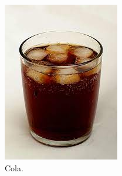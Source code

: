 \documentclass{article}
\begin{document}
	\begin{figure}[h!]
		\centering
		\begin{subfigure}[b]{0.2\linewidth}
		
		\includegraphics[width=\linewidth]{drink.jpg}
		    \caption{Cola.} \end{subfigure}
	    \begin{subfigure}[b]{0.2\linewidth}

\end{subfigure}
\end{figure}
\end{document}

